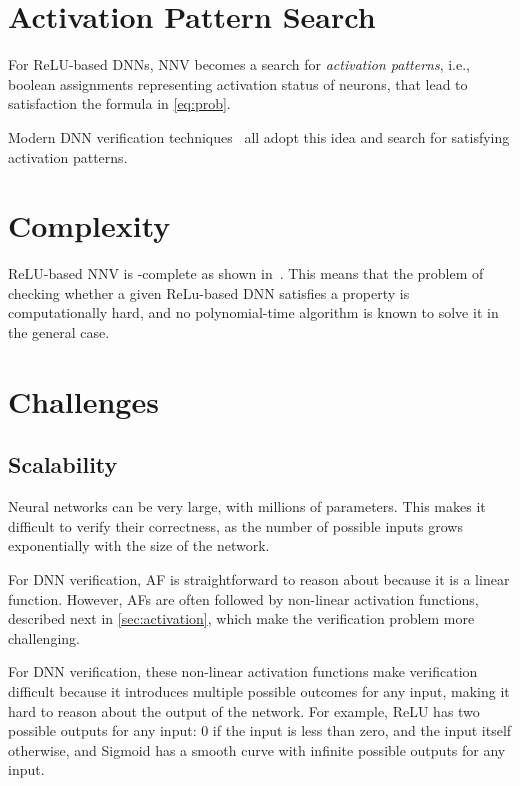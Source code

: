 \documentclass[oneside,11pt,dvipsnames]{book}
\numberwithin{equation}{section}
\theoremstyle{definition}
\theoremstyle{remark}
\newcommand{\tvn}[1]{\iftoggle{usecomment}{{\color{red}{[TVN]: #1}}}{}}
\newcommand{\hai}[1]{\iftoggle{usecomment}{{\color{blue}{[HD]: #1}}}{}}
\begin{document}
\section{Activation Pattern Search} For ReLU-based DNNs, NNV becomes a search for \emph{activation patterns}, i.e., boolean assignments representing activation status of neurons, that lead to satisfaction the formula in \autoref{eq:prob}. 

Modern DNN verification techniques~\cite{bunel2020branch,wang2021beta,ferrari2022complete,duong2024harnessing,duong2023dpllt,ovalbab,katz2019marabou,bak2021nnenum} all adopt this idea and search for satisfying activation patterns.

\tvn{example of activation pattern search? using the above DNN example}
\hai{I will pull the example from our paper, but I think we also should create a tree to demonstrate how it proceeds -- I will work on this}
\section{Complexity}\label{sec:complexity}

ReLU-based NNV is \NP{}-complete as shown in~\cite{katz2017reluplex,salzer2023reachability}. This means that the problem of checking whether a given ReLu-based DNN satisfies a property is computationally hard, and no polynomial-time algorithm is known to solve it in the general case.

\section{Challenges} %

\subsection{Scalability} Neural networks can be very large, with millions of parameters. This makes it difficult to verify their correctness, as the number of possible inputs grows exponentially with the size of the network.

For DNN verification, AF is straightforward to reason about because it is a linear function. However, AFs are often followed by non-linear activation functions, described next in \autoref{sec:activation}, which make the verification problem more challenging.

For DNN verification, these non-linear activation functions make verification difficult because it introduces multiple possible outcomes for any input, making it hard to reason about the output of the network. For example, ReLU has two possible outputs for any input: 0 if the input is less than zero, and the input itself otherwise, and Sigmoid has a smooth curve with infinite possible outputs for any input.
\end{document}
